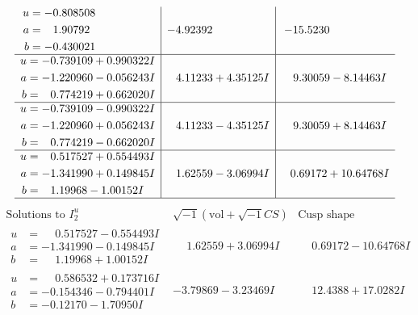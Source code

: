 \documentclass[1p]{elsarticle_modified}
\theoremstyle{definition}
\newcommand{\I}{\sqrt{-1}}
\begin{document}
$$\begin{array}{c|c|c}
\begin{aligned}
u &= -0.808508\phantom{ +0.000000I} \\
a &= \phantom{-}1.90792\phantom{ +0.000000I} \\
b &= -0.430021\phantom{ +0.000000I}\end{aligned}
 & -4.92392\phantom{ +0.000000I} & -15.5230\phantom{ +0.000000I} \\ \hline\begin{aligned}
u &= -0.739109 + 0.990322 I \\
a &= -1.220960 - 0.056243 I \\
b &= \phantom{-}0.774219 + 0.662020 I\end{aligned}
 & \phantom{-}4.11233 + 4.35125 I & \phantom{-}9.30059 - 8.14463 I \\ \hline\begin{aligned}
u &= -0.739109 - 0.990322 I \\
a &= -1.220960 + 0.056243 I \\
b &= \phantom{-}0.774219 - 0.662020 I\end{aligned}
 & \phantom{-}4.11233 - 4.35125 I & \phantom{-}9.30059 + 8.14463 I \\ \hline\begin{aligned}
u &= \phantom{-}0.517527 + 0.554493 I \\
a &= -1.341990 + 0.149845 I \\
b &= \phantom{-}1.19968 - 1.00152 I\end{aligned}
 & \phantom{-}1.62559 - 3.06994 I & \phantom{-}0.69172 + 10.64768 I\\
 \hline 
 \end{array}$$\newpage$$\begin{array}{c|c|c}  
\text{Solutions to }I^u_{2}& \I (\text{vol} + \sqrt{-1}CS) & \text{Cusp shape}\\
 \hline 
\begin{aligned}
u &= \phantom{-}0.517527 - 0.554493 I \\
a &= -1.341990 - 0.149845 I \\
b &= \phantom{-}1.19968 + 1.00152 I\end{aligned}
 & \phantom{-}1.62559 + 3.06994 I & \phantom{-}0.69172 - 10.64768 I \\ \hline\begin{aligned}
u &= \phantom{-}0.586532 + 0.173716 I \\
a &= -0.154346 - 0.794401 I \\
b &= -0.12170 - 1.70950 I\end{aligned}
 & -3.79869 - 3.23469 I & \phantom{-}12.4388 + 17.0282 I \\ \hline\begin{aligned}

\end{aligned}
\end{array}$$
\end{document}
